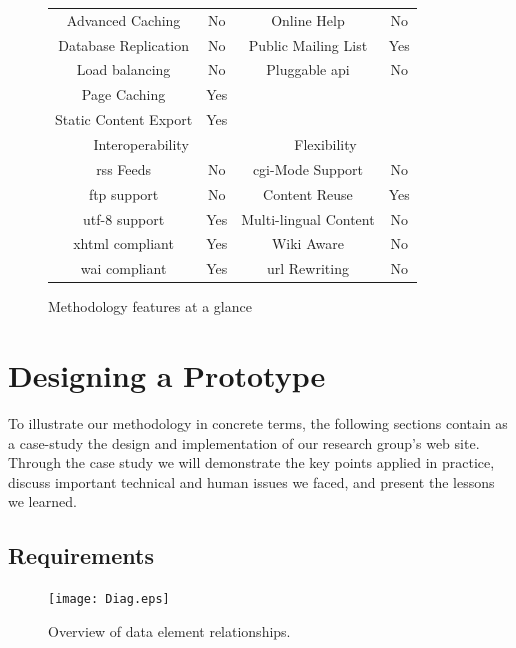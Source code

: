 \documentclass{elsart}
\begin{document}
\begin{figure}
\begin{center}
\begin{tabular}{c c | c c}
\hline
Advanced Caching & No & Online Help & No\\
Database Replication & No & Public Mailing List & Yes\\
Load balancing & No & Pluggable {\sc api} & No\\
Page Caching & Yes & &\\
Static Content Export & Yes & &\\
\hline
\multicolumn{2}{c|}{Interoperability} & \multicolumn{2}{c}{Flexibility}\\
\hline
{\sc rss} Feeds & No & {\sc cgi}-Mode Support & No\\
{\sc ftp} support & No & Content Reuse & Yes\\
{\sc utf-8} support & Yes & Multi-lingual Content & No\\
{\sc xhtml} compliant & Yes & Wiki Aware & No\\
{\sc wai} compliant & Yes & {\sc url} Rewriting & No\\
\hline
\end{tabular}
\end{center}
\caption{Methodology features at a glance}
\label{tbl:cms-matrix}
\end{figure}

\section{Designing a Prototype}

To illustrate our methodology in concrete terms, 
the following sections contain as a case-study the design and implementation
of our research group's web site.
Through the case study we will demonstrate the key points applied in
practice, discuss important technical and human issues we faced,
and present the lessons we learned.

\subsection{Requirements}
\label{sec:requirements}

\begin{figure}
\begin{center}
\texttt{[image: Diag.eps]}
\end{center}
\caption{Overview of data element relationships.}
\label{fig:diag}
\end{figure}
\end{document}
